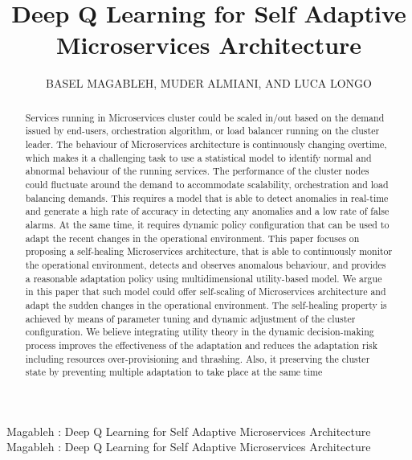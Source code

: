 \documentclass{ieeeaccess}
\begin{document}

\title{Deep Q Learning for Self Adaptive Microservices Architecture}
\author{\uppercase{Basel Magableh}, 
\uppercase{Muder Almiani, and Luca Longo}}
\address[1]{Technological University, Dublin, Ireland (e-mail: basel.magableh@dit.ie)}
\address[2]{Al-Hussein Bin Tala University, Ma'am, Jordan (e-mail: malmiani@my.bridgeport.edu)}
\address[3]{Technological University, Dublin, Ireland (e-mail: luca.longo@dit.ie)}
\tfootnote{}

\markboth
{Magableh \headeretal: Deep Q Learning for Self Adaptive Microservices Architecture  }
{Magableh \headeretal: Deep Q Learning for Self Adaptive Microservices Architecture}


\begin{abstract}
 Services running in Microservices cluster could be scaled in/out based on the demand issued by end-users, orchestration algorithm, or load balancer running on the cluster leader. The behaviour of Microservices architecture is continuously changing overtime, which makes it a challenging task to use a statistical model to identify normal and abnormal behaviour of the running services. The performance of the cluster nodes could fluctuate around the demand to accommodate scalability, orchestration and load balancing demands. 
 This requires a model that is able to detect anomalies in real-time and generate a high rate of accuracy in detecting any anomalies and a low rate of false alarms. At the same time, it requires dynamic policy configuration that can be used to adapt the recent changes in the operational environment. This paper focuses on proposing a self-healing Microservices architecture, that is able to continuously monitor the operational environment, detects and observes anomalous behaviour, and provides a reasonable adaptation policy using multidimensional utility-based model. We argue in this paper that such model could offer self-scaling of Microservices architecture and adapt the sudden changes in the operational environment. The self-healing property is achieved by means of parameter tuning and dynamic adjustment of the cluster configuration. We believe integrating utility theory in the dynamic decision-making process improves the effectiveness of the adaptation and reduces the adaptation risk including resources over-provisioning and thrashing. Also, it preserving the cluster state by preventing multiple adaptation to take place at the same time
\end{abstract}
\end{document}
